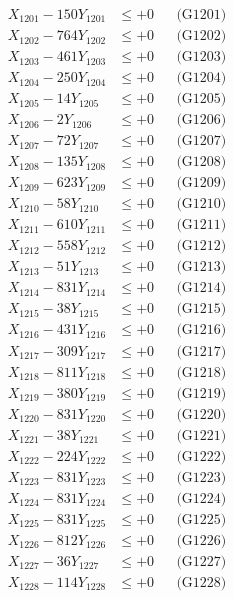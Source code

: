 \documentclass[a4paper,10pt]{article}
\begin{document}
{\begin{align}
\allowbreak
X_{1201} - 150Y_{1201} &\leq +0 && \text{(G1201)} \\
X_{1202} - 764Y_{1202} &\leq +0 && \text{(G1202)} \\
X_{1203} - 461Y_{1203} &\leq +0 && \text{(G1203)} \\
X_{1204} - 250Y_{1204} &\leq +0 && \text{(G1204)} \\
X_{1205} - 14Y_{1205} &\leq +0 && \text{(G1205)} \\
X_{1206} - 2Y_{1206} &\leq +0 && \text{(G1206)} \\
X_{1207} - 72Y_{1207} &\leq +0 && \text{(G1207)} \\
X_{1208} - 135Y_{1208} &\leq +0 && \text{(G1208)} \\
X_{1209} - 623Y_{1209} &\leq +0 && \text{(G1209)} \\
X_{1210} - 58Y_{1210} &\leq +0 && \text{(G1210)} \\
\allowbreak
X_{1211} - 610Y_{1211} &\leq +0 && \text{(G1211)} \\
X_{1212} - 558Y_{1212} &\leq +0 && \text{(G1212)} \\
X_{1213} - 51Y_{1213} &\leq +0 && \text{(G1213)} \\
X_{1214} - 831Y_{1214} &\leq +0 && \text{(G1214)} \\
X_{1215} - 38Y_{1215} &\leq +0 && \text{(G1215)} \\
X_{1216} - 431Y_{1216} &\leq +0 && \text{(G1216)} \\
X_{1217} - 309Y_{1217} &\leq +0 && \text{(G1217)} \\
X_{1218} - 811Y_{1218} &\leq +0 && \text{(G1218)} \\
X_{1219} - 380Y_{1219} &\leq +0 && \text{(G1219)} \\
X_{1220} - 831Y_{1220} &\leq +0 && \text{(G1220)} \\
\allowbreak
X_{1221} - 38Y_{1221} &\leq +0 && \text{(G1221)} \\
X_{1222} - 224Y_{1222} &\leq +0 && \text{(G1222)} \\
X_{1223} - 831Y_{1223} &\leq +0 && \text{(G1223)} \\
X_{1224} - 831Y_{1224} &\leq +0 && \text{(G1224)} \\
X_{1225} - 831Y_{1225} &\leq +0 && \text{(G1225)} \\
X_{1226} - 812Y_{1226} &\leq +0 && \text{(G1226)} \\
X_{1227} - 36Y_{1227} &\leq +0 && \text{(G1227)} \\
X_{1228} - 114Y_{1228} &\leq +0 && \text{(G1228)} \\

\end{align}}
\end{document}
